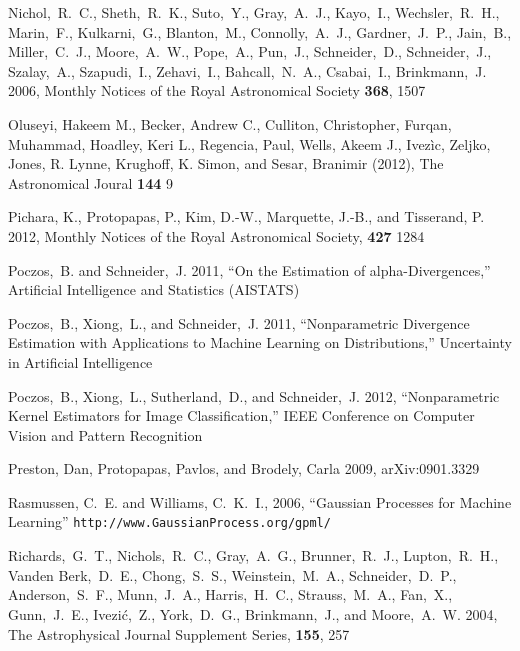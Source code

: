 \documentclass[useAMS,usenatbib,tightenlines,11pt,preprint]{aastex}
\begin{document}
\begin{thebibliography}{99}
Nichol,~R.~C., Sheth,~R.~K., Suto,~Y., Gray,~A.~J., Kayo,~I., Wechsler,~R.~H.,
Marin,~F., Kulkarni,~G., Blanton,~M., Connolly,~A.~J., Gardner,~J.~P., Jain,~B.,
Miller,~C.~J., Moore,~A.~W., Pope,~A., Pun,~J., Schneider,~D., Schneider,~J.,
Szalay,~A., Szapudi,~I., Zehavi,~I., Bahcall,~N.~A., Csabai,~I., Brinkmann,~J.
2006, Monthly Notices of the Royal Astronomical Society {\bf 368}, 1507

Oluseyi, Hakeem M., Becker, Andrew C., Culliton, Christopher, Furqan, Muhammad,
Hoadley, Keri L., Regencia, Paul, Wells, Akeem J., Ivez\`ic, Zeljko, Jones, R.
Lynne, Krughoff, K. Simon, and Sesar, Branimir (2012), The Astronomical Joural
{\bf 144} 9

Pichara, K., Protopapas, P., Kim, D.-W., Marquette, J.-B., and Tisserand, P.
2012, Monthly Notices of the Royal Astronomical Society, {\bf 427} 1284

Poczos,~B. and Schneider,~J. 2011, ``On the Estimation of alpha-Divergences,''
Artificial Intelligence and Statistics (AISTATS)

Poczos,~B., Xiong,~L., and Schneider,~J. 2011, ``Nonparametric Divergence Estimation with
Applications to Machine Learning on Distributions,''  Uncertainty in Artificial
Intelligence

Poczos,~B., Xiong,~L., Sutherland,~D., and Schneider,~J. 2012,
``Nonparametric Kernel Estimators for Image Classification,''
IEEE Conference on Computer Vision and Pattern Recognition

Preston, Dan, Protopapas, Pavlos, and Brodely, Carla 2009, arXiv:0901.3329

Rasmussen, C.~E. and Williams, C.~K.~I., 2006, ``Gaussian
Processes for Machine Learning''
\verb|http://www.GaussianProcess.org/gpml/|

Richards,~G.~T., Nichols,~R.~C., Gray,~A.~G., Brunner,~R.~J., Lupton,~R.~H.,
Vanden Berk,~D.~E., Chong,~S.~S., Weinstein,~M.~A., Schneider,~D.~P.,
Anderson,~S.~F., Munn,~J.~A., Harris,~H.~C., Strauss,~M.~A., Fan,~X.,
Gunn,~J.~E., Ivezi\'c,~Z., York,~D.~G., Brinkmann,~J., and Moore,~A.~W. 2004,
The Astrophysical Journal Supplement Series, {\bf 155}, 257


\end{thebibliography}
\end{document}

